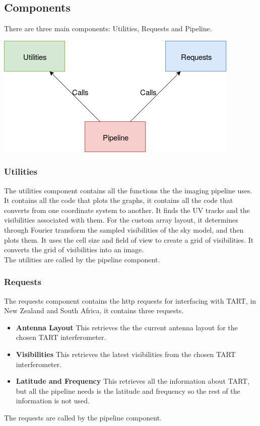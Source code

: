 \subsection{Components}
There are three main components: Utilities, Requests and Pipeline.
\begin{center}
    \includegraphics[scale=0.6]{images/BLOCKDIAGRAM.png}
\end{center}{}
\subsubsection{Utilities}
The utilities component contains all the functions the the imaging pipeline uses.\\
It contains all the code that plots the graphs, it contains all the code that converts from one coordinate system to another. It finds the UV tracks and the visibilities associated with them. For the custom array layout, it determines through Fourier transform the sampled visibilities of the sky model, and then plots them. It uses the cell size and field of view to create a grid of visibilities. It converts the grid of visibilities into an image.\\
The utilities are called by the pipeline component.

\subsubsection{Requests}
The requests component contains the http requests for interfacing with TART, in New Zealand and South Africa, it contains three requests.
\begin{itemize}
    \item \textbf{Antenna Layout} This retrieves the the current antenna layout for the chosen TART interferometer.
    \item \textbf{Visibilities} This retrieves the latest visibilities from the chosen TART interferometer.
    \item \textbf{Latitude and Frequency} This retrieves all the information about TART, but all the pipeline needs is the latitude and frequency so the rest of the information is not used.
\end{itemize}
The requests are called by the pipeline component.


